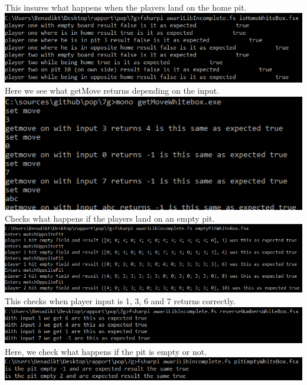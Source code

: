 \documentclass{article}
\begin{document}
        \\
        This insures what happens when the players land on the home pit.
        \\
        \includegraphics[scale=0.6]{isHomeWhiteBox.png}
        \\
        Here we see what getMove returns depending on the input.
        \\
        \includegraphics[scale=0.5]{getMoveWhiteBox.png}
        \\
        Checks what happens if the players land on an empty pit.
        \\
        \includegraphics[scale=0.6]{emptyPitWhiteBox.png}
        \\
        This checks when player input is 1, 3, 6 and 7 returns correctly.
        \\
        \includegraphics[scale=0.6]{reverseNumbersWhiteBox.png}
        \\
        Here, we check what happens if the pit is empty or not.
        \\
        \includegraphics[scale=0.6]{pitEmptyWhiteBox.png}
        \\
\end{document}
